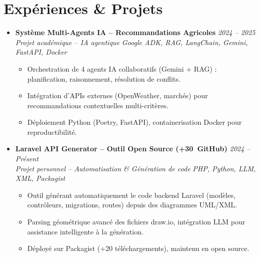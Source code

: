 \documentclass[a4paper,11pt]{article}
\begin{document}
\section{Expériences \& Projets}
\begin{itemize}[leftmargin=*, label={-}]

\item \textbf{Système Multi-Agents IA -- Recommandations Agricoles} \hfill \textit{2024 -- 2025} \\
\textit{Projet académique -- IA agentique} \hfill \textit{Google ADK, RAG, LangChain, Gemini, FastAPI, Docker}
\vspace{-2pt}
    \begin{itemize}[leftmargin=0.4cm, nosep, label=\tiny$\bullet$]
        \item \small{Orchestration de 4 agents IA collaboratifs (Gemini + RAG) : planification, raisonnement, résolution de conflits.}
        \item \small{Intégration d'APIs externes (OpenWeather, marchés) pour recommandations contextuelles multi-critères.}
        \item \small{Déploiement Python (Poetry, FastAPI), containerisation Docker pour reproductibilité.}
    \end{itemize}
\vspace{3pt}

\item \textbf{Laravel API Generator -- Outil Open Source (+30\faStarHalf\ GitHub)} \hfill \textit{2024 -- Présent} \\
\textit{Projet personnel -- Automatisation \& Génération de code} \hfill \textit{PHP, Python, LLM, XML, Packagist}
\vspace{-2pt}
    \begin{itemize}[leftmargin=0.4cm, nosep, label=\tiny$\bullet$]
        \item \small{Outil générant automatiquement le code backend Laravel (modèles, contrôleurs, migrations, routes) depuis des diagrammes UML/XML.}
        \item \small{Parsing géométrique avancé des fichiers draw.io, intégration LLM pour assistance intelligente à la génération.}
        \item \small{Déployé sur Packagist (+20 téléchargements), maintenu en open source.}
    \end{itemize}
\vspace{3pt}


\end{itemize}
\end{document}

